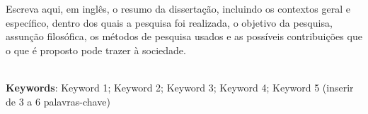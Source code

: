 \begin{thesisabastract}
Escreva aqui, em ingl\^es, o resumo da disserta\c{c}\~ao, incluindo os contextos geral e espec\'ifico, dentro dos quais a pesquisa foi realizada, o objetivo da pesquisa, assun\c{c}\~ao filos\'ofica, os m\'etodos de pesquisa usados e as poss\'iveis contribui\c{c}\~oes que o que \'e proposto pode trazer \`a sociedade.

\ \\


\textbf{Keywords}: Keyword 1; Keyword 2; Keyword 3; Keyword 4; Keyword 5 (inserir de 3 a 6 palavras-chave)



\end{thesisabastract}
